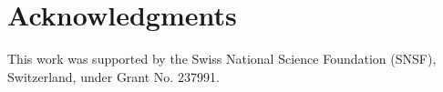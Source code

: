 \documentclass[sigconf]{acmart}
\begin{document}
 \section*{Acknowledgments}
This work was supported by the Swiss National Science Foundation (SNSF), Switzerland, under Grant No. 237991.\\



\end{document}
